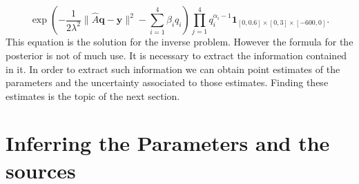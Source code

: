 \documentclass[12pt]{book}
\newcommand{\q}{\textbf{q}}
\newcommand{\y}{\textbf{y}}
\begin{document}
\begin{equation}\label{eqnPosteriorFinal}
\exp\left(-\frac{1}{2\lambda^{2}}\|\widehat{A}\q-\y\|^{2}-\sum_{i=1}^{4}\beta_{i}q_{i}\right)\prod_{j=1}^{4}q_{i}^{\alpha_{i}-1}\textbf{1}_{[0,0.6]\times[0,3]\times[-600,0]}.
\end{equation}
This equation is the solution for the inverse problem. However the formula for the posterior is not of much use. It is
necessary to extract the information contained in it. In order to extract such information we can
obtain point estimates of the parameters and the uncertainty associated to those estimates. 
Finding these estimates is the topic of the next section.



\section{Inferring the Parameters and the sources}
\end{document}
